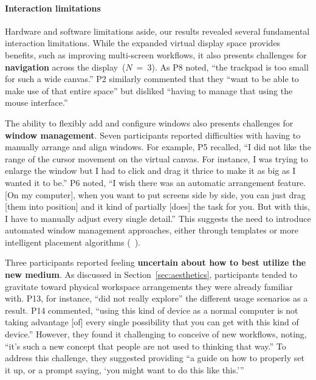 \paragraph{Interaction limitations}
Hardware and software limitations aside, 
our results revealed several fundamental interaction limitations. 
While the expanded virtual display space provides benefits, such as improving multi-screen workflows, it also presents challenges for \textbf{navigation} across the display~($N$~=~3).
As P8 noted, ``the trackpad is too small for such a wide canvas.'' 
P2 similarly commented that they ``want to be able to make use of that entire space'' but disliked ``having to manage that using the mouse interface.''


The ability to flexibly add and configure windows also presents challenges for \textbf{window management}. 
Seven participants 
reported difficulties with having to manually arrange and align windows.
For example, P5 recalled, ``I did not like the range of the cursor movement on the virtual canvas. For instance, I was trying to enlarge the window but I had to click and drag it thrice to make it as big as I wanted it to be.''
P6 noted, ``I wish there was an automatic arrangement feature. [On my computer], when you want to put screens side by side, you can just drag [them into position] and it kind of partially [does] the task for you. But with this, I have to manually adjust every single detail.''
This suggests the need to introduce automated window management approaches, either through templates or more intelligent placement algorithms (\eg~\cite{cheng2021semanticadapt}). 

Three participants reported feeling \textbf{uncertain about how to best utilize the new medium}. 
As discussed in Section~\ref{sec:aesthetics}, participants tended to gravitate toward physical workspace arrangements they were already familiar with.
P13, for instance, ``did not really explore'' the different usage scenarios as a result. 
P14 commented, ``using this kind of device as a normal computer is not taking advantage [of] every single possibility that you can get with this kind of device.''
However, they found it challenging to conceive of new workflows, noting, 
``it's such a new concept that people are not used to thinking that way.''
To address this challenge, they suggested providing ``a guide on how to properly set it up, or a prompt saying, `you might want to do this like this.'{}''

